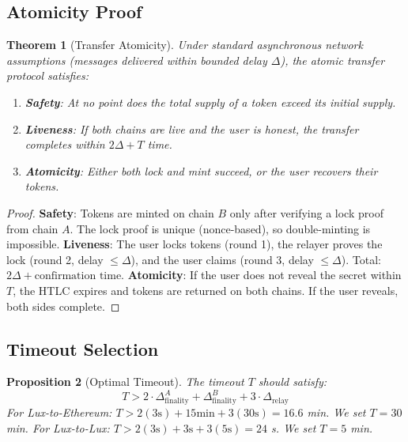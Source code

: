 \documentclass[11pt,a4paper]{article}
\newtheorem{theorem}{Theorem}
\newtheorem{proposition}[theorem]{Proposition}
\begin{document}
\subsection{Atomicity Proof}

\begin{theorem}[Transfer Atomicity]
Under standard asynchronous network assumptions (messages delivered within bounded delay $\Delta$), the atomic transfer protocol satisfies:
\begin{enumerate}
    \item \textbf{Safety}: At no point does the total supply of a token exceed its initial supply.
    \item \textbf{Liveness}: If both chains are live and the user is honest, the transfer completes within $2\Delta + T$ time.
    \item \textbf{Atomicity}: Either both lock and mint succeed, or the user recovers their tokens.
\end{enumerate}
\end{theorem}

\begin{proof}
\textbf{Safety}: Tokens are minted on chain $B$ only after verifying a lock proof from chain $A$. The lock proof is unique (nonce-based), so double-minting is impossible. \textbf{Liveness}: The user locks tokens (round 1), the relayer proves the lock (round 2, delay $\leq \Delta$), and the user claims (round 3, delay $\leq \Delta$). Total: $2\Delta + \text{confirmation time}$. \textbf{Atomicity}: If the user does not reveal the secret within $T$, the HTLC expires and tokens are returned on both chains. If the user reveals, both sides complete.
\end{proof}

\subsection{Timeout Selection}

\begin{proposition}[Optimal Timeout]
The timeout $T$ should satisfy:
\begin{equation}
    T > 2 \cdot \Delta_{\text{finality}}^A + \Delta_{\text{finality}}^B + 3 \cdot \Delta_{\text{relay}}
\end{equation}
For Lux-to-Ethereum: $T > 2(3\text{s}) + 15\text{min} + 3(30\text{s}) = 16.6$ min. We set $T = 30$ min.
For Lux-to-Lux: $T > 2(3\text{s}) + 3\text{s} + 3(5\text{s}) = 24$ s. We set $T = 5$ min.
\end{proposition}
\end{document}
